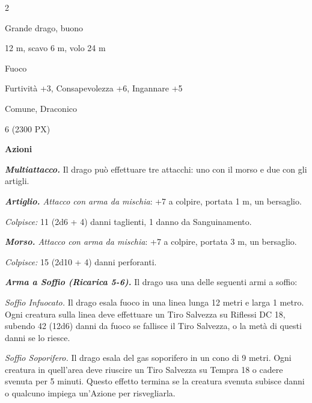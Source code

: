 \begin{multicols}{2}
{
\begin{description}[noitemsep, topsep=0pt, parsep=0pt, partopsep=0pt, itemsep=1pt, leftmargin=2.35cm,  labelwidth=2.2cm, itemindent=0cm, listparindent=0pt] %
\setlength{\baselineskip}{10pt}
\item[\textbf{Taglia/Tipo}] Grande drago, buono
\item[\textbf{Caratt.}] 
\item[\textbf{Punti Ferita}] 
\item[\textbf{Movimento}] 12 m, scavo 6 m, volo 24 m
\item[\textbf{Tiri Salvez.}] 
\item[\textbf{Imm. Danni}] Fuoco
\item[\textbf{Comp.}] Furtività +3, Consapevolezza +6, Ingannare +5
\item[\textbf{Sensi}] 
\item[\textbf{Linguaggi}] Comune, Draconico
\item[\textbf{Sfida}] 6 (2300 PX)
\end{description}
\smallskip

\textbf{Azioni}

\emph{\textbf{Multiattacco.}} Il drago può effettuare tre attacchi: uno con il morso e due con gli artigli.

\emph{\textbf{Artiglio.} Attacco con arma da mischia}: +7 a colpire, portata 1 m, un bersaglio.

\emph{Colpisce:} 11 (2d6 + 4) danni taglienti, 1 danno da Sanguinamento.

\emph{\textbf{Morso.} Attacco con arma da mischia}: +7 a colpire, portata 3 m, un bersaglio.

\emph{Colpisce:} 15 (2d10 + 4) danni perforanti.

\emph{\textbf{Arma a Soffio (Ricarica 5-6).}} Il drago usa una delle seguenti armi a soffio:

\emph{Soffio Infuocato.} Il drago esala fuoco in una linea lunga 12 metri e larga 1 metro. Ogni creatura sulla linea deve effettuare un Tiro Salvezza su Riflessi DC 18, subendo 42 (12d6) danni da fuoco se fallisce il Tiro Salvezza, o la metà di questi danni se lo riesce.

\emph{Soffio Soporifero.} Il drago esala del gas soporifero in un cono di 9 metri. Ogni creatura in quell'area deve riuscire un Tiro Salvezza su Tempra 18 o cadere svenuta per 5 minuti. Questo effetto termina se la creatura svenuta subisce danni o qualcuno impiega un'Azione per risvegliarla.

}
\end{multicols}
